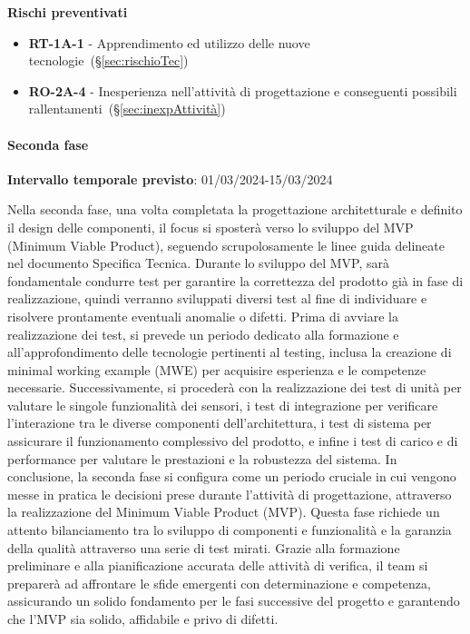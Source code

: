 \vspace{0.4cm}

\textbf{Rischi preventivati}
\begin{itemize}
    \item \textbf{RT-1A-1} - Apprendimento ed utilizzo delle nuove tecnologie~(\S\ref{sec:rischioTec})
    \item \textbf{RO-2A-4} - Inesperienza nell’attività di progettazione e conseguenti possibili rallentamenti~(\S\ref{sec:inexpAttività})
\end{itemize}

\paragraph{Seconda fase}

\textbf{Intervallo temporale previsto}: 01/03/2024-15/03/2024 \\

\vspace{0.2cm}

Nella seconda fase, una volta completata la progettazione architetturale e definito il design delle componenti, il focus si sposterà verso lo sviluppo del MVP (Minimum Viable Product), seguendo scrupolosamente le linee guida delineate nel documento Specifica Tecnica. Durante lo sviluppo del MVP, sarà fondamentale condurre test per garantire la correttezza del prodotto già in fase di realizzazione, quindi verranno sviluppati diversi test al fine di individuare e risolvere prontamente eventuali anomalie o difetti.
Prima di avviare la realizzazione dei test, si prevede un periodo dedicato alla formazione e all'approfondimento delle tecnologie pertinenti al testing, inclusa la creazione di minimal working example (MWE) per acquisire esperienza e le competenze necessarie.
Successivamente, si procederà con la realizzazione dei test di unità per valutare le singole funzionalità dei sensori, i test di integrazione per verificare l'interazione tra le diverse componenti dell'architettura, i test di sistema per assicurare il funzionamento complessivo del prodotto, e infine i test di carico e di performance per valutare le prestazioni e la robustezza del sistema.
In conclusione, la seconda fase si configura come un periodo cruciale in cui vengono messe in pratica le decisioni prese durante l’attività di progettazione, attraverso la realizzazione del Minimum Viable Product (MVP). Questa fase richiede un attento bilanciamento tra lo sviluppo di componenti e funzionalità e la garanzia della qualità attraverso una serie di test mirati. Grazie alla formazione preliminare e alla pianificazione accurata delle attività di verifica, il team si preparerà ad affrontare le sfide emergenti con determinazione e competenza, assicurando un solido fondamento per le fasi successive del progetto e garantendo che l'MVP sia solido, affidabile e privo di difetti.

